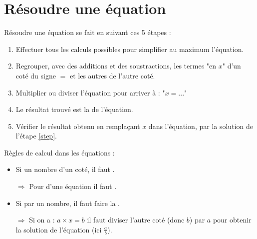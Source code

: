 \documentclass[12pt,a4paper]{article}
\begin{document}
\section{Résoudre une équation}

\begin{mymeth}
	Résoudre une équation se fait en suivant ces 5 étapes :
	\begin{enumerate}
		\item Effectuer tous les calculs possibles pour simplifier au maximum l'équation.
		\item Regrouper, avec des additions et des soustractions, les termes "en $x$" d'un coté du signe $=$ et les autres de l'autre coté.
		\item Multiplier ou diviser l'équation pour arriver à : "$x = ...$"
		\item Le résultat trouvé est la  de l'équation.\label{step}
		\item Vérifier le résultat obtenu en remplaçant $x$ dans l'équation, par la solution de l'étape \ref{step}.
	\end{enumerate}
	
	
\end{mymeth}


\begin{myprops}
	Règles de calcul dans les équations :
	\begin{itemize}
		\item Si  un nombre d'un coté, il faut .\label{rule1}
		\item[$\Rightarrow$] Pour  d'une équation il faut .\label{rule1.1}
		\item Si  par un nombre, il faut faire la .\label{rule2}
		\item[$\Rightarrow$] Si on a : $a \times x = b$ il faut diviser l'autre coté (donc $b$) par $a$ pour obtenir la solution de l'équation (ici $\frac{a}{b}$).\label{rule2.1}   
		
	\end{itemize}
\end{myprops}

\end{document}
